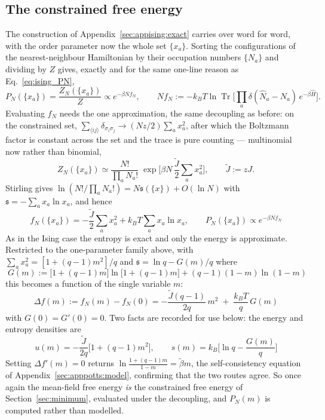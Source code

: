 \documentclass[10pt,a4paper]{article}
\theoremstyle{remark}
\newcommand{\Tr}{\operatorname{Tr}}
\begin{document}
\subsection{The constrained free energy}
\label{sec:apppotts:exact}

The construction of Appendix~\ref{sec:appising:exact} carries over word for word,
with the order parameter now the whole set $\{x_a\}$. Sorting the configurations
of the nearest-neighbour Hamiltonian by their occupation numbers $\{N_a\}$ and
dividing by $Z$ gives, exactly and for the same one-line reason as
Eq.~\eqref{eq:ising_PN},
\[
P_N(\{x_a\})=\frac{Z_N(\{x_a\})}{Z}\propto e^{-\beta Nf_N},
\qquad
Nf_N:=-k_BT\ln\Tr\Big[\textstyle\prod_a\delta(\hat N_a-N_a)\,e^{-\beta\hat H}\Big].
\]
Evaluating $f_N$ needs the one approximation, the same decoupling as before: on
the constrained set, $\sum_{\langle ij\rangle}\delta_{\sigma_i\sigma_j}\to
(Nz/2)\sum_ax_a^{2}$, after which the Boltzmann factor is constant across the set
and the trace is pure counting --- multinomial now rather than binomial,
\[
Z_N(\{x_a\})\simeq\frac{N!}{\prod_a N_a!}\;
\exp\Big[\beta N\,\frac{\tilde J}{2}\sum_a x_a^{2}\Big],
\qquad \tilde J:= zJ .
\]
Stirling gives $\ln(N!/\prod_aN_a!)=N\mathfrak{s}(\{x\})+O(\ln N)$ with
$\mathfrak{s}=-\sum_ax_a\ln x_a$, and hence
\[
\;
f_N(\{x_a\})=-\frac{\tilde J}{2}\sum_a x_a^{2}
+k_BT\sum_a x_a\ln x_a ,
\qquad
P_N(\{x_a\})\propto e^{-\beta N f_N}\
\]
As in the Ising case the entropy is exact and only the energy is approximate.
Restricted to the one-parameter family above, with
$\sum_ax_a^{2}=[1+(q-1)m^{2}]/q$ and
$\mathfrak{s}=\ln q-G(m)/q$ where
\[
\;
G(m):=\big[1+(q-1)m\big]\ln\big[1+(q-1)m\big]+(q-1)(1-m)\ln(1-m)\
\]
this becomes a function of the single variable $m$:
\[
\;
\Delta f(m):= f_N(m)-f_N(0)
=-\frac{\tilde J(q-1)}{2q}\,m^{2}\;+\;\frac{k_BT}{q}\,G(m)\
\]
with $G(0)=G'(0)=0$. Two facts are recorded for use below: the energy and entropy
densities are
\[
\;
u(m)=-\frac{\tilde J}{2q}\big[1+(q-1)m^{2}\big],
\qquad
s(m)=k_B\Big[\ln q-\frac{G(m)}{q}\Big]\
\]
Setting $\Delta f'(m)=0$ returns
$\ln\frac{1+(q-1)m}{1-m}=\tilde\beta m$, the self-consistency equation of
Appendix~\ref{sec:apppotts:model}, confirming that the two routes agree. So once
again the mean-field free energy \emph{is} the constrained free energy of
Section~\ref{sec:minimum}, evaluated under the decoupling, and $P_N(m)$ is
computed rather than modelled.
\end{document}
